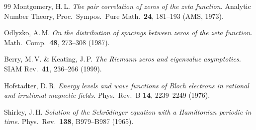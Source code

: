 \begin{thebibliography}{99}
Montgomery, H.\,L.
\textit{The pair correlation of zeros of the zeta function.}
Analytic Number Theory, Proc.\ Sympos.\ Pure Math.\ \textbf{24},
181--193 (AMS, 1973).

Odlyzko, A.\,M.
\textit{On the distribution of spacings between zeros of the zeta function.}
Math.\ Comp.\ \textbf{48}, 273--308 (1987).

Berry, M.\,V. \& Keating, J.\,P.
\textit{The Riemann zeros and eigenvalue asymptotics.}
SIAM Rev.\ \textbf{41}, 236--266 (1999).

Hofstadter, D.\,R.
\textit{Energy levels and wave functions of Bloch electrons in rational
and irrational magnetic fields.}
Phys.\ Rev.\ B \textbf{14}, 2239--2249 (1976).

Shirley, J.\,H.
\textit{Solution of the Schrödinger equation with a Hamiltonian periodic in time.}
Phys.\ Rev.\ \textbf{138}, B979--B987 (1965).

\end{thebibliography}
